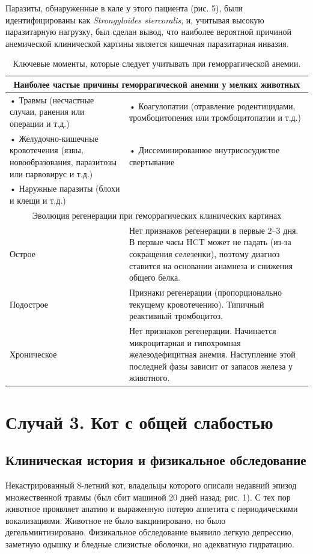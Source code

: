 \documentclass[a4paper,12pt]{book}
\begin{document}
Паразиты, обнаруженные в кале у этого пациента (рис. 5), были идентифицированы как \textit{Strongyloides stercoralis}, и, учитывая высокую паразитарную нагрузку, был сделан вывод, что наиболее вероятной причиной анемической клинической картины является кишечная паразитарная инвазия.

\begin{table}[htbp]
\centering
\caption{Ключевые моменты, которые следует учитывать при геморрагической анемии.}
\begin{tabular}{p{7cm}p{7cm}}
\toprule
\multicolumn{2}{c}{Наиболее частые причины геморрагической анемии у мелких животных} \\
\midrule
• Травмы (несчастные случаи, ранения или операции и т.д.) & • Коагулопатии (отравление родентицидами, тромбоцитопения или тромбоцитопатии и т.д.) \\
• Желудочно-кишечные кровотечения (язвы, новообразования, паразитозы или парвовирус и т.д.) & • Диссеминированное внутрисосудистое свертывание \\
• Наружные паразиты (блохи и клещи и т.д.) & \\
\midrule
\multicolumn{2}{c}{Эволюция регенерации при геморрагических клинических картинах} \\
Острое & Нет признаков регенерации в первые 2--3 дня. В первые часы HCT может не падать (из-за сокращения селезенки), поэтому диагноз ставится на основании анамнеза и снижения общего белка. \\
Подострое & Признаки регенерации (пропорционально текущему кровотечению). Типичный реактивный тромбоцитоз. \\
Хроническое & Нет признаков регенерации. Начинается микроцитарная и гипохромная железодефицитная анемия. Наступление этой последней фазы зависит от запасов железа у животного. \\
\bottomrule
\end{tabular}
\end{table}

\section{Случай 3. Кот с общей слабостью}
\subsection*{Клиническая история и физикальное обследование}
Некастрированный 8-летний кот, владельцы которого описали недавний эпизод множественной травмы (был сбит машиной 20 дней назад; рис. 1). С тех пор животное проявляет апатию и выраженную потерю аппетита с периодическими вокализациями. Животное не было вакцинировано, но было дегельминтизировано. Физикальное обследование выявило легкую депрессию, заметную одышку и бледные слизистые оболочки, но адекватную гидратацию.
\end{document}
